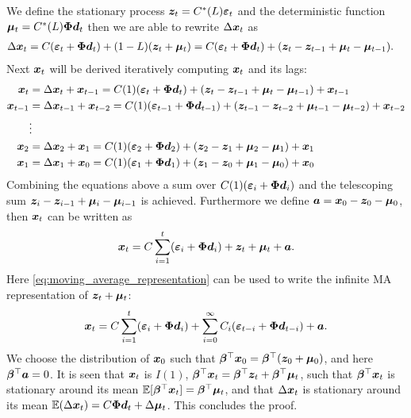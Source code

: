 \begin{bevis}
\noindent We define the stationary process $\boldsymbol{z}_t=C^\ast (L)\boldsymbol{\varepsilon}_t$ and the deterministic function $\boldsymbol{\mu}_t=C^\ast(L)\boldsymbol{\Phi} \boldsymbol{d}_t$ then we are able to rewrite $\Delta \boldsymbol{x}_t$ as
    \begin{align*}
        \Delta \boldsymbol{x}_t&=C(\boldsymbol{\varepsilon}_t+\boldsymbol{\Phi} \boldsymbol{d}_t)+(1-L)(\boldsymbol{z}_t+\boldsymbol{\mu}_t)=C(\boldsymbol{\varepsilon}_t+\boldsymbol{\Phi} \boldsymbol{d}_t)+(\boldsymbol{z}_t-\boldsymbol{z}_{t-1}+\boldsymbol{\mu}_t-\boldsymbol{\mu}_{t-1}).
        \end{align*}
        Next $\boldsymbol{x}_t$ will be derived iteratively computing $\boldsymbol{x}_t$ and its lags:
        \begin{align*}
    \boldsymbol{x}_t&=\Delta \boldsymbol{x}_t+\boldsymbol{x}_{t-1}=C(1)(\boldsymbol{\varepsilon}_t+\boldsymbol{\Phi} \boldsymbol{d}_t)+(\boldsymbol{z}_t-\boldsymbol{z}_{t-1}+\boldsymbol{\mu}_t-\boldsymbol{\mu}_{t-1})+\boldsymbol{x}_{t-1} \\
     \boldsymbol{x}_{t-1}&=\Delta \boldsymbol{x}_{t-1}+\boldsymbol{x}_{t-2}=C(1)(\boldsymbol{\varepsilon}_{t-1}+\boldsymbol{\Phi} \boldsymbol{d}_{t-1})+(\boldsymbol{z}_{t-1}-\boldsymbol{z}_{t-2}+\boldsymbol{\mu}_{t-1}-\boldsymbol{\mu}_{t-2})+\boldsymbol{x}_{t-2}\\
     &\vdots\\
     \boldsymbol{x}_2&=\Delta \boldsymbol{x}_2+\boldsymbol{x}_{1}=C(1)(\boldsymbol{\varepsilon}_2+\boldsymbol{\Phi} \boldsymbol{d}_2)+(\boldsymbol{z}_2-\boldsymbol{z}_{1}+\boldsymbol{\mu}_2-\boldsymbol{\mu}_{1})+\boldsymbol{x}_{1} \\
     \boldsymbol{x}_1&=\Delta \boldsymbol{x}_1+\boldsymbol{x}_{0}=C(1)(\boldsymbol{\varepsilon}_1+\boldsymbol{\Phi} \boldsymbol{d}_1)+(\boldsymbol{z}_1-\boldsymbol{z}_{0}+\boldsymbol{\mu}_1-\boldsymbol{\mu}_{0})+\boldsymbol{x}_{0}
    \end{align*}
    Combining the equations above a sum over $C(1)(\boldsymbol{\varepsilon}_i+\boldsymbol{\Phi} \boldsymbol{d}_i)$ and the telescoping sum $\boldsymbol{z}_i-\boldsymbol{z}_{i-1}+\boldsymbol{\mu}_i-\boldsymbol{\mu}_{i-1}$ is achieved. Furthermore we define $\boldsymbol{a}=\boldsymbol{x}_0-\boldsymbol{z}_0-\boldsymbol{\mu}_0$, then $\boldsymbol{x}_t$ can be written as
\begin{align}
    \boldsymbol{x}_t=C\sum^{t}_{i=1}(\boldsymbol{\varepsilon}_i+\boldsymbol{\Phi} \boldsymbol{d}_i)+\boldsymbol{z}_t+\boldsymbol{\mu}_t+\boldsymbol{a}.
\end{align}
Here \eqref{eq:moving_average_representation} can be used to write the infinite MA representation of $\boldsymbol{z}_t+\boldsymbol{\mu}_t$:
\begin{align}
    \boldsymbol{x}_t=C\sum^{t}_{i=1}(\boldsymbol{\varepsilon}_i+\boldsymbol{\Phi} \boldsymbol{d}_i)+\sum_{i=0}^{\infty}C_i(\boldsymbol{\varepsilon}_{t-i}+\boldsymbol{\Phi} \boldsymbol{d}_{t-i})+\boldsymbol{a}.
\end{align} 
We choose the distribution of $\boldsymbol{x}_0$ such that $\boldsymbol{\beta}^{\top}\boldsymbol{x}_0=\boldsymbol{\beta}^\top(\boldsymbol{z}_0+\boldsymbol{\mu}_0)$, and here $\boldsymbol{\beta}^\top \boldsymbol{a}=0$. It is seen that $\boldsymbol{x}_t$ is $I(1)$, $\boldsymbol{\beta}^\top \boldsymbol{x}_t=\boldsymbol{\beta}^{\top}\boldsymbol{z}_t+\boldsymbol{\beta}^\top \boldsymbol{\mu}_t$, such that $\boldsymbol{\beta}^\top \boldsymbol{x}_t$ is stationary around its mean $\mathbb{E}[\boldsymbol{\beta}^{\top} \boldsymbol{x}_t]=\boldsymbol{\beta}^{\top} \boldsymbol{\mu}_t$, and that $\Delta \boldsymbol{x}_t$ is stationary around its mean $\mathbb{E}(\Delta \boldsymbol{x}_t) =C\boldsymbol{\Phi} \boldsymbol{d}_t +\Delta\boldsymbol{\mu}_t$. This concludes the proof.

\end{bevis}





